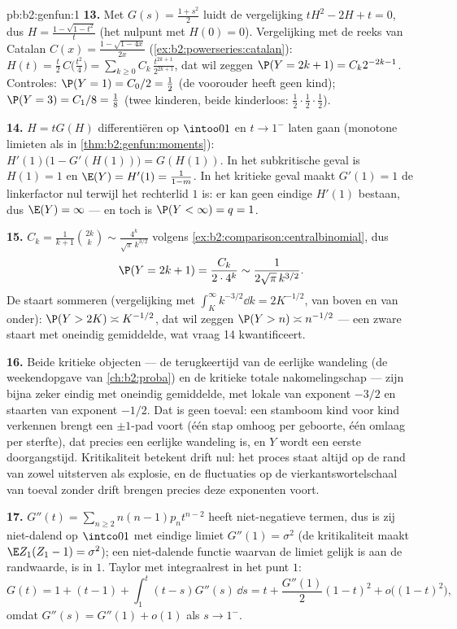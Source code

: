 \begin{solution}{pb:b2:genfun:1}
\textbf{13.} Met $G(s) = \frac{1 + s^2}2$ luidt de vergelijking
$tH^2 - 2H + t = 0$, dus $H = \frac{1 - \sqrt{1 - t^2}}{t}$ (het
nulpunt met $H(0) = 0$). Vergelijking met de reeks van Catalan
$C(x) = \frac{1 - \sqrt{1 - 4x}}{2x}$
(\cref{ex:b2:powerseries:catalan}): $H(t) = \frac
t2\,C\bigl(\frac{t^2}4\bigr) =
\sum_{k\geq0}C_k\,\frac{t^{2k+1}}{2^{2k+1}}$, dat wil zeggen $\P(Y
= 2k+1) = C_k2^{-2k-1}$. Controles: $\P(Y = 1) = C_0/2 = \frac12$
(de voorouder heeft geen kind); $\P(Y = 3) = C_1/8 = \frac18$ (twee
kinderen, beide kinderloos: $\frac12\cdot\frac12\cdot \frac12$).

\textbf{14.} $H = tG(H)$ differentiëren op $\intoo01$ en $t \to
1^-$ laten gaan (monotone limieten als in
\cref{thm:b2:genfun:moments}): $H'(1)\bigl(1 - G'(H(1))\bigr) =
G(H(1))$. In het subkritische geval is $H(1) = 1$ en $\E(Y) = H'(1)
= \frac1{1 - m}$. In het kritieke geval maakt $G'(1) = 1$ de
linkerfactor nul terwijl het rechterlid $1$ is: er kan geen eindige
$H'(1)$ bestaan, dus $\E(Y) = \infty$ --- en toch is $\P(Y <
\infty) = q = 1$.

\textbf{15.} $C_k = \frac1{k+1}\binom{2k}k \sim
\frac{4^k}{\sqrt\pi\,k^{3/2}}$ volgens
\cref{ex:b2:comparison:centralbinomial}, dus
\[
\P(Y = 2k+1) = \frac{C_k}{2\cdot4^{k}} \sim
\frac1{2\sqrt\pi\,k^{3/2}} .
\]
De staart sommeren (vergelijking met $\int_K^\infty
k^{-3/2}\dd k = 2K^{-1/2}$, van boven en van onder): $\P(Y > 2K)
\asymp K^{-1/2}$, dat wil zeggen $\P(Y > n) \asymp n^{-1/2}$ ---
een zware staart met oneindig gemiddelde, wat vraag 14
kwantificeert.

\textbf{16.} Beide kritieke objecten --- de terugkeertijd van de
eerlijke wandeling (de weekendopgave van \cref{ch:b2:proba}) en de
kritieke totale nakomelingschap --- zijn bijna zeker eindig met
oneindig gemiddelde, met lokale  van exponent $-3/2$ en
staarten van exponent $-1/2$. Dat is geen toeval: een stamboom kind
voor kind verkennen brengt een $\pm1$-pad voort (één stap omhoog
per geboorte, één omlaag per sterfte), dat precies een eerlijke
wandeling is, en $Y$ wordt een eerste doorgangstijd. Kritikaliteit
betekent drift nul: het proces staat altijd op de rand van zowel
uitsterven als explosie, en de fluctuaties op de
vierkantswortelschaal van toeval zonder drift brengen precies deze
exponenten voort.

\textbf{17.} $G''(t) = \sum_{n\geq2}n(n-1)p_nt^{n-2}$ heeft
niet-negatieve termen, dus is zij niet-dalend op $\intco01$ met
eindige limiet $G''(1) = \sigma^2$ (de kritikaliteit maakt $\E
Z_1(Z_1 - 1) = \sigma^2$); een niet-dalende functie waarvan de
limiet gelijk is aan de randwaarde, is  in $1$. Taylor met
integraalrest in het punt $1$:
\[
G(t) = 1 + (t - 1) + \int_1^t(t - s)G''(s)\,\dd s
= t + \frac{G''(1)}2(1-t)^2 + o\bigl((1-t)^2\bigr),
\]
omdat $G''(s) = G''(1) + o(1)$ als $s \to 1^-$.


\end{solution}
